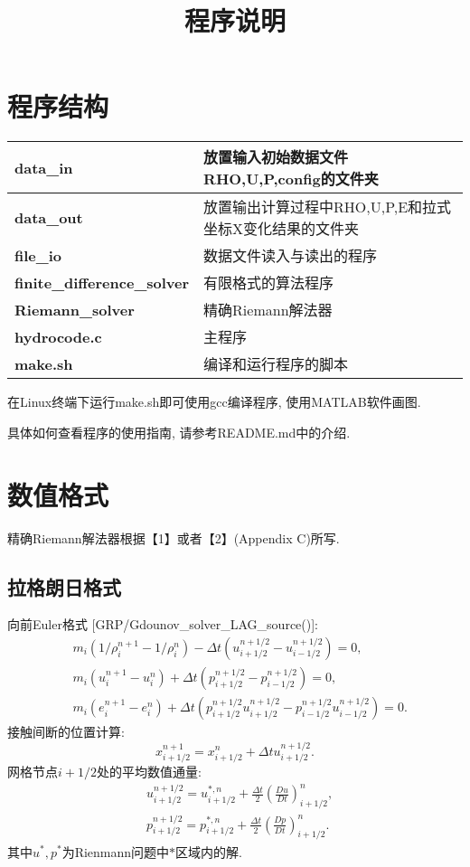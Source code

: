 \documentclass[CJK]{ctexart}
\begin{document}
\title{程序说明}
\date{}
\maketitle

\section{程序结构}

\begin{table}[htbp]
\begin{tabular}{|l|l|}
\hline
\textbf{data\_in}  & 放置输入初始数据文件RHO,U,P,config的文件夹\\
\hline
\textbf{data\_out} & 放置输出计算过程中RHO,U,P,E和拉式坐标X变化结果的文件夹\\
\hline
\textbf{file\_io}  & 数据文件读入与读出的程序\\
\hline
\textbf{finite\_difference\_solver} & 有限格式的算法程序\\
\hline
\textbf{Riemann\_solver} & 精确Riemann解法器\\
\hline
\textbf{hydrocode.c}     & 主程序\\
\hline
\textbf{make.sh}         & 编译和运行程序的脚本\\
\hline
\end{tabular}
\end{table}

在Linux终端下运行make.sh即可使用gcc编译程序, 使用MATLAB软件画图.

具体如何查看程序的使用指南, 请参考README.md中的介绍.

\section{数值格式}

精确Riemann解法器根据【1】或者【2】(Appendix C)所写.

\subsection{拉格朗日格式}

向前Euler格式 [GRP/Gdounov\_solver\_LAG\_source()]:
\begin{align*}
& m_i(1/\rho_i^{n+1}-1/\rho_i^{n})-\Delta t(u_{i+1/2}^{n+1/2}-u_{i-1/2}^{n+1/2})=0,\\
& m_i(u_i^{n+1}-u_i^{n})+\Delta t(p_{i+1/2}^{n+1/2}-p_{i-1/2}^{n+1/2})=0,\\
& m_i(e_i^{n+1}-e_i^{n})+\Delta t(p_{i+1/2}^{n+1/2} u_{i+1/2}^{n+1/2}-p_{i-1/2}^{n+1/2} u_{i-1/2}^{n+1/2})=0.
\end{align*}
接触间断的位置计算:
$$
x_{i+1/2}^{n+1}=x_{i+1/2}^{n}+\Delta t u_{i+1/2}^{n+1/2}.
$$
网格节点$i+1/2$处的平均数值通量:
\begin{align*}
& u_{i+1/2}^{n+1/2}=u_{i+1/2}^{*,n}+\frac{\Delta t}{2}\left(\frac{D u}{D t}\right)_{i+1/2}^{n}, \\
& p_{i+1/2}^{n+1/2}=p_{i+1/2}^{*,n}+\frac{\Delta t}{2}\left(\frac{D p}{D t}\right)_{i+1/2}^{n}.
\end{align*}
其中$u^{*},p^{*}$为Rienmann问题中$*$区域内的解.
\end{document}
